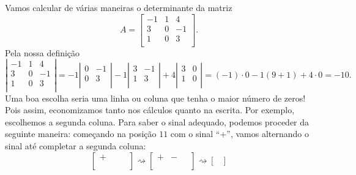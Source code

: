 \documentclass[../livro.tex]{subfiles}  %
\begin{document}
\begin{example}
Vamos calcular de várias maneiras o determinante da matriz
\begin{equation}
A = 
\begin{bmatrix}
-1 & 1 & 4 \\
 3 & 0 & -1 \\
 1 & 0 & 3 \\
\end{bmatrix}.
\end{equation} Pela nossa definição
\begin{equation}
\left| 
\begin{matrix}
-1 & 1 & 4 \\
3 & 0 & -1 \\
1 & 0 & 3 \\
\end{matrix}
\right| =
-1 \left| 
\begin{matrix}
 0 & -1 \\
 0 & 3 \\
\end{matrix}
\right| - 1 \left| 
\begin{matrix}
3  & -1 \\
1  & 3 \\
\end{matrix}
\right| + 4 
\left| 
\begin{matrix}
3 & 0  \\
1 & 0  \\
\end{matrix}
\right| = (-1)\cdot 0 - 1 (9 + 1) + 4 \cdot 0 = -10.
\end{equation} Uma boa escolha seria uma linha ou coluna que tenha o maior número de zeros! Pois assim, economizamos tanto nos cálculos quanto na escrita. Por exemplo, escolhemos a segunda coluna. Para saber o sinal adequado, podemos proceder da seguinte maneira: começando na posição $11$ com o sinal ``$+$'', vamos alternando o sinal até completar a segunda coluna:
\begin{equation}
\begin{bmatrix}
+ & \,\,  & \,\,  \\
  &  &   \\
  &  &   
\end{bmatrix} \rightsquigarrow 
\begin{bmatrix}
+ & - & \,\,  \\
\,\,& \,\, & \,\,  \\
\,\,& \,\, &  \,\, 
\end{bmatrix}\rightsquigarrow 
\begin{bmatrix}

\end{bmatrix}
\end{equation}
\end{example}
\end{document}
